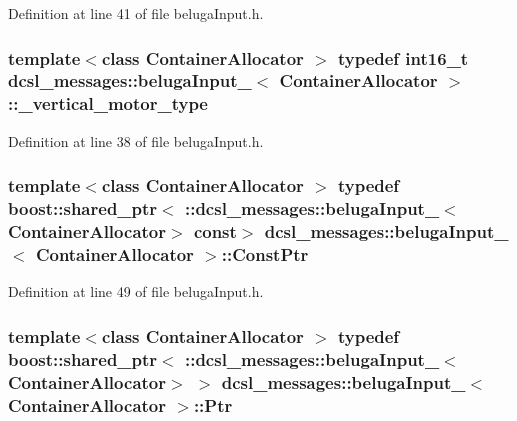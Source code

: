 \-Definition at line 41 of file beluga\-Input.\-h.

\subsubsection[{\-\_\-vertical\-\_\-motor\-\_\-type}]{\setlength{\rightskip}{0pt plus 5cm}template$<$class Container\-Allocator $>$ typedef int16\-\_\-t {\bf dcsl\-\_\-messages\-::beluga\-Input\-\_\-}$<$ \-Container\-Allocator $>$\-::{\bf \-\_\-vertical\-\_\-motor\-\_\-type}}\label{structdcsl__messages_1_1belugaInput___a1313758c724e262104dc68cd135eb750}


\-Definition at line 38 of file beluga\-Input.\-h.

\subsubsection[{\-Const\-Ptr}]{\setlength{\rightskip}{0pt plus 5cm}template$<$class Container\-Allocator $>$ typedef boost\-::shared\-\_\-ptr$<$ \-::{\bf dcsl\-\_\-messages\-::beluga\-Input\-\_\-}$<$\-Container\-Allocator$>$ const$>$ {\bf dcsl\-\_\-messages\-::beluga\-Input\-\_\-}$<$ \-Container\-Allocator $>$\-::{\bf \-Const\-Ptr}}\label{structdcsl__messages_1_1belugaInput___a3039b9515e227406789730ef24096460}


\-Definition at line 49 of file beluga\-Input.\-h.

\subsubsection[{\-Ptr}]{\setlength{\rightskip}{0pt plus 5cm}template$<$class Container\-Allocator $>$ typedef boost\-::shared\-\_\-ptr$<$ \-::{\bf dcsl\-\_\-messages\-::beluga\-Input\-\_\-}$<$\-Container\-Allocator$>$ $>$ {\bf dcsl\-\_\-messages\-::beluga\-Input\-\_\-}$<$ \-Container\-Allocator $>$\-::{\bf \-Ptr}}\label{structdcsl__messages_1_1belugaInput___ad0b5fe3e0abaa151640c53ccc1e3327c}



